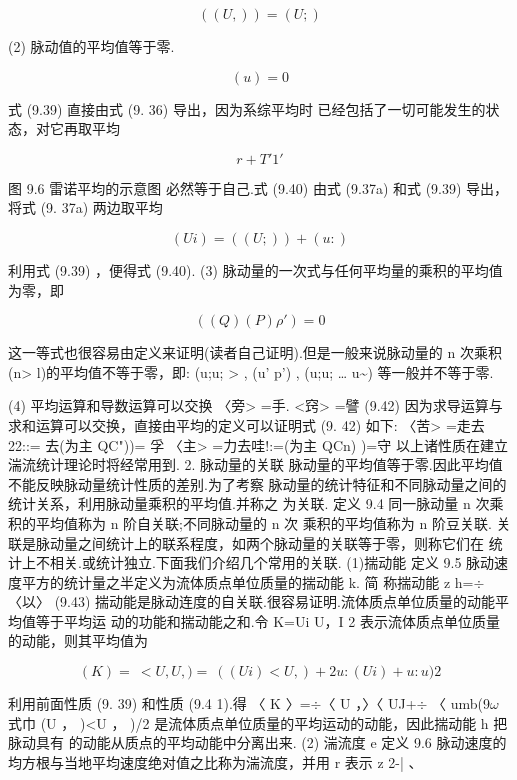 \begin{equation*}((U ,)) = (U;)\tag{9.39}\end{equation*}

(2) 脉动值的平均值等于零.

\begin{equation*}(u) = 0\tag{9.40}\end{equation*}

式 (9.39) 直接由式 (9. 36) 导出，因为系综平均时 已经包括了一切可能发生的状态，对它再取平均

\[r+T '1'\]

图 9.6 雷诺平均的示意图 必然等于自己.式 (9.40) 由式 (9.37a) 和式 (9.39) 导出，将式 (9. 37a) 两边取平均

\[(U i ) = ((U;)) + (u:)\]

利用式 (9.39) ，便得式 (9.40). (3) 脉动量的一次式与任何平均量的乘积的平均值为零，即

\begin{equation*}((Q)(P) \rho ')=0\tag{9.41}\end{equation*}

这一等式也很容易由定义来证明(读者自己证明).但是一般来说脉动量的 n 次乘积 (n> l)的平均值不等于零，即: (u;u; > , (u' p') , (u;u; … u\textasciitilde{}) 等一般并不等于零.

(4) 平均运算和导数运算可以交换 〈旁> =手. <窍> =譬 (9.42) 因为求导运算与求和运算可以交换，直接由平均的定义可以证明式 (9. 42) 如下: 〈苦> =走去 22::= 去(为主 QC"))= 孚 〈主> =力去哇!:=(为主 QCn) )=守 以上诸性质在建立湍流统计理论时将经常用到. 2. 脉动量的关联 脉动量的平均值等于零.因此平均值不能反映脉动量统计性质的差别.为了考察 脉动量的统计特征和不同脉动量之间的统计关系，利用脉动量乘积的平均值.并称之 为关联. 定义 9.4 同一脉动量 n 次乘积的平均值称为 n 阶自关联;不同脉动量的 n 次 乘积的平均值称为 n 阶豆关联. 关联是脉动量之间统计上的联系程度，如两个脉动量的关联等于零，则称它们在 统计上不相关.或统计独立.下面我们介绍几个常用的关联. (1)揣动能 定义 9.5 脉动速度平方的统计量之半定义为流体质点单位质量的揣动能 k. 简 称揣动能 z h=$\div$ 〈以〉 (9.43) 揣动能是脉动连度的自关联.很容易证明.流体质点单位质量的动能平均值等于平均运 动的功能和揣动能之和.令 K=Ui U，I 2 表示流体质点单位质量的动能，则其平均值为

\[(K) = ~ <U,U,) = ~ ((Ui)<U ,) +2u:(U i ) +u:u) 2\]

利用前面性质 (9. 39) 和性质 (9.4 1).得 〈 K 〉=$\div$〈 U ，〉〈 UJ+$\div$ 〈 umb(9$\omega$ 式巾 (U ， )<U ， )/2 是流体质点单位质量的平均运动的动能，因此揣动能 h 把脉动具有 的动能从质点的平均动能中分离出来. (2) 湍流度 e 定义 9.6 脉动速度的均方根与当地平均速度绝对值之比称为湍流度，并用 r 表示 z 2-| 、

